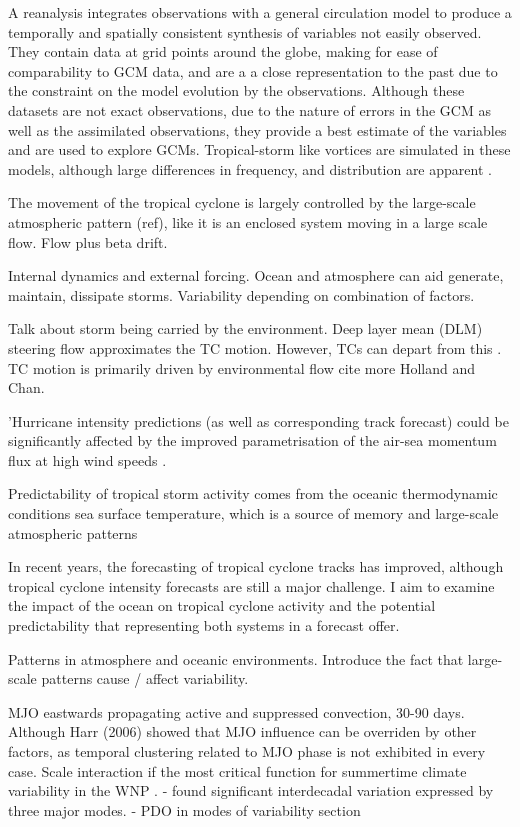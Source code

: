 A reanalysis integrates observations with a general circulation model to produce a temporally and spatially consistent synthesis of variables not easily observed. They contain data at grid points around the globe, making for ease of comparability to GCM data, and are a a close representation to the past due to the constraint on the model evolution by the observations. Although these datasets are not exact observations, due to the nature of errors in the GCM as well as the assimilated observations, they provide a best estimate of the variables and are used to explore GCMs. Tropical-storm like vortices are simulated in these models, although large differences in frequency, and distribution are apparent \citep{murakami2014tropical}.

The movement of the tropical cyclone is largely controlled by the large-scale atmospheric pattern (ref), like it is an enclosed system moving in a large scale flow. Flow plus beta drift.

Internal dynamics and external forcing.
Ocean and atmosphere can aid generate, maintain, dissipate storms. Variability depending on combination of factors.

Talk about storm being carried by the environment. Deep layer mean (DLM) steering flow approximates the TC motion.
However, TCs can depart from this \citep{galarneau2013diagnosing}. TC motion is primarily driven by environmental flow \citep{chan1982tropical} cite more Holland and Chan.

'Hurricane intensity predictions (as well as corresponding track forecast) could be significantly affected by the improved parametrisation of the air-sea momentum flux at high wind speeds \citep{moon2004effect}. 

Predictability of tropical storm activity comes from the oceanic thermodynamic conditions sea surface temperature, which is a source of memory and large-scale atmospheric patterns

In recent years, the forecasting of tropical cyclone tracks has improved, although tropical cyclone intensity forecasts are still a major challenge. I aim to examine the impact of the ocean on tropical cyclone activity and the potential predictability that representing both systems in a forecast offer.

Patterns in atmosphere and oceanic environments.
Introduce the fact that large-scale patterns cause / affect variability. 

MJO eastwards propagating active and suppressed convection, 30-90 days.
Although Harr (2006) showed that MJO influence can be overriden by other factors, as temporal clustering related to MJO phase is not exhibited in every case. Scale interaction if the most critical function for summertime climate variability in the WNP \citep{kim2008systematic}.
\citep{liu2008interdecadal}- found significant interdecadal variation expressed by three major modes.  - PDO in modes of variability section

